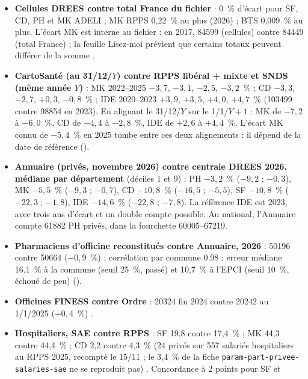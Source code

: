 \begin{itemize}
  \item \textbf{Cellules DREES contre total France du fichier} : 0~\%\mesure{} d'écart pour SF, CD, PH et MK
  ADELI ; MK RPPS 0,22~\%\mesure{} au plus (2026) ; BTS 0,009~\%\mesure{} au plus. L'écart MK est interne au
  fichier : en 2017, \num{84599}\mesure{} (cellules) contre \num{84449}\mesure{} (total France) ; la feuille
  Lisez-moi prévient que certains totaux peuvent différer de la somme \citep{d-drees2026demo}.
  \item \textbf{CartoSanté (au 31/12/$Y$) contre RPPS libéral + mixte et SNDS (même année $Y$)} : MK 2022--2025
  $-3{,}7$, $-3{,}1$, $-2{,}5$, $-3{,}2$~\%\mesure{} ; CD $-3{,}3$, $-2{,}7$, $+0{,}3$, $-0{,}8$~\%\mesure{} ;
  IDE 2020--2023 $+3{,}9$, $+3{,}5$, $+4{,}0$, $+4{,}7$~\%\mesure{} (\num{103499} contre \num{98854}\mesure{} en
  2023). En alignant le 31/12/$Y$ sur le 1/1/$Y+1$ : MK de $-7{,}2$ à $-6{,}0$~\%\mesure{}, CD de $-4{,}4$ à
  $-2{,}8$~\%\mesure{}, IDE de $+2{,}6$ à $+4{,}4$~\%\mesure. L'écart MK connu de $-5{,}4$~\%\mesure{} en 2025
  tombe entre ces deux alignements : il dépend de la date de référence\derive{} ().
  \item \textbf{Annuaire (privés, novembre 2026) contre centrale DREES 2026, médiane par département} (déciles
  1 et 9) : PH $-3{,}2$~\% ($-9{,}2$ ; $-0{,}3$), MK $-5{,}5$~\% ($-9{,}3$ ; $-0{,}7$), CD $-10{,}8$~\%
  ($-16{,}5$ ; $-5{,}5$), SF $-10{,}8$~\% ($-22{,}3$ ; $-1{,}8$), IDE $-14{,}6$~\% ($-22{,}8$ ;
  $-7{,}8$)\mesure. La référence IDE est 2023, avec trois ans d'écart et un double compte possible. Au national,
  l'Annuaire compte \num{61882}\mesure{} PH privés, dans la fourchette \num{60005}--\num{67219}.
  \item \textbf{Pharmaciens d'officine reconstitués contre Annuaire, 2026} : \num{50196} contre
  \num{50664}\mesure{} ($-0{,}9$~\%\derive) ; corrélation par commune \num{0.98}\mesure{} ; erreur médiane
  16,1~\%\mesure{} à la commune (seuil 25~\%\suppose, passé) et 10,7~\%\mesure{} à l'EPCI (seuil
  10~\%\suppose, échoué de peu) ().
  \item \textbf{Officines FINESS contre Ordre} : \num{20324}\mesure{} fin 2024 contre \num{20242}\mesure{} au
  1/1/2025 ($+0{,}4$~\%\derive) \citep{d-ordre2025demo}.
  \item \textbf{Hospitaliers, SAE contre RPPS} : SF 19,8 contre 17,4~\%\mesure{} ; MK 44,3 contre
  44,4~\%\mesure{} ; CD 2,2 contre 4,3~\%\mesure{} (24 privés sur 557 salariés hospitaliers au RPPS 2025, recompté le 15/11 ; le 3,4~\% de la fiche \texttt{param-part-privee-salaries-sae} ne se reproduit pas) \citep{d-sae708}. Concordance à 2\derive{} points pour SF et

\end{itemize}
